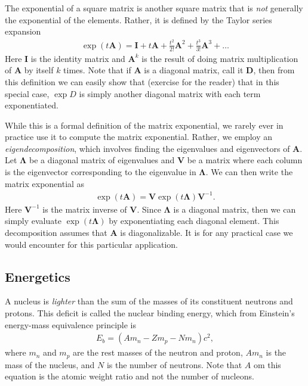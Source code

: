The exponential of a square matrix is another square matrix that is \emph{not} generally the exponential of the elements. Rather, it is defined by the Taylor series expansion
\begin{align}
  \exp( t \mathbf{A} ) = \mathbf{I} + t \mathbf{A} + \frac{t^2}{2!} \mathbf{A}^2 + \frac{t^3}{3!} \mathbf{A}^3 + \ldots
\end{align}
Here $\mathbf{I}$ is the identity matrix and $\mathbf{A}^k$ is the result of doing matrix multiplication of $\mathbf{A}$ by itself $k$ times. Note that if $\mathbf{A}$ is a diagonal matrix, call it $\mathbf{D}$, then from this definition we can easily show that (exercise for the reader) that in this special case, $\exp{D}$ is simply another diagonal matrix with each term exponentiated.

While this is a formal definition of the matrix exponential, we rarely ever in practice use it to compute the matrix exponential. Rather, we employ an \emph{eigendecomposition}, which involves finding the eigenvalues and eigenvectors of $\mathbf{A}$. Let $\boldsymbol\Lambda$ be a diagonal matrix of eigenvalues and $\mathbf{V}$ be a matrix where each column is the eigenvector corresponding to the eigenvalue in $\boldsymbol\Lambda$. We can then write the matrix exponential as
\begin{align}
   \exp( t \mathbf{A} ) = \mathbf{V} \exp( t \boldsymbol\Lambda ) \mathbf{V}^{-1} .
\end{align}
Here $\mathbf{V}^{-1}$ is the matrix inverse of $\mathbf{V}$. Since $\boldsymbol\Lambda$ is a diagonal matrix, then we can simply evaluate $\exp( t \boldsymbol\Lambda )$ by exponentiating each diagonal element. This decomposition assumes that $\mathbf{A}$ is diagonalizable. It is for any practical case we would encounter for this particular application.

\subsection{Energetics}

A nucleus is \emph{lighter} than the sum of the masses of its constituent neutrons and protons. This deficit is called the nuclear binding energy, which from Einstein's energy-mass equivalence principle is
\begin{align}
  E_b = ( A m_n - Z m_p - N m_n ) c^2 ,
\end{align}
where $m_n$ and $m_p$ are the rest masses of the neutron and proton, $A m_n$ is the mass of the nucleus, and $N$ is the number of neutrons. Note that $A$ om this equation is the atomic weight ratio and not the number of nucleons.

